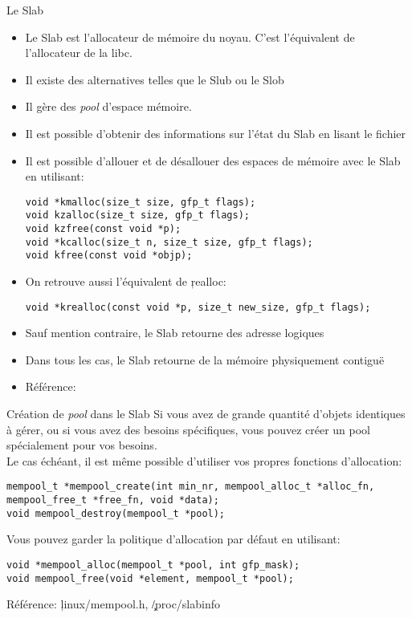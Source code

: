 \begin{frame}[fragile=singleslide]{Le Slab}
  \begin{itemize} 
  \item  Le   Slab  est  l'allocateur  de  mémoire   du  noyau.  C'est
    l'équivalent de l'allocateur de la libc.
  \item Il existe des alternatives telles que le Slub ou le Slob
  \item Il gère des \emph{pool} d'espace mémoire. 
  \item Il est possible d'obtenir  des informations sur l'état du Slab
    en lisant le fichier 
  \item  Il est  possible d'allouer  et  de désallouer  des espaces  de
    mémoire avec le Slab en utilisant:
    \begin{lstlisting} 
void *kmalloc(size_t size, gfp_t flags);
void kzalloc(size_t size, gfp_t flags);
void kzfree(const void *p);
void *kcalloc(size_t n, size_t size, gfp_t flags);
void kfree(const void *objp);
    \end{lstlisting} 
  \item On retrouve aussi l'équivalent de \c{realloc}:
    \begin{lstlisting} 
void *krealloc(const void *p, size_t new_size, gfp_t flags);
    \end{lstlisting} 
  \item Sauf mention contraire, le Slab retourne des adresse logiques
  \item Dans tous les cas, le Slab retourne de la mémoire physiquement
    contiguë
  \item Référence: 
  \end{itemize} 
\end{frame} 

\begin{frame}[fragile=singleslide]{Création de \emph{pool} dans le Slab}
  Si vous avez  de grande quantité d'objets identiques  à gérer, ou si
  vous  avez  des  besoins  spécifiques,  vous pouvez  créer  un  pool
  spécialement pour vos besoins.
  \\[2ex]
  Le  cas  échéant,  il  est  même  possible  d'utiliser  vos  propres
  fonctions d'allocation:
  \begin{lstlisting} 
mempool_t *mempool_create(int min_nr, mempool_alloc_t *alloc_fn, mempool_free_t *free_fn, void *data);
void mempool_destroy(mempool_t *pool);
  \end{lstlisting} 
  Vous  pouvez   garder  la  politique  d'allocation   par  défaut  en
  utilisant:
  \begin{lstlisting} 
void *mempool_alloc(mempool_t *pool, int gfp_mask);
void mempool_free(void *element, mempool_t *pool);
  \end{lstlisting} 
  Référence: \c{linux/mempool.h}, \c{/proc/slabinfo}
\end{frame}

